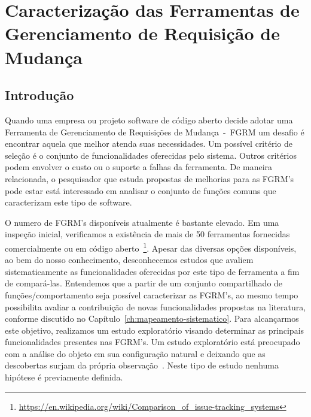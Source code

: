\chapter{Caracterização das Ferramentas de Gerenciamento de Requisição de
	Mudança}
\label{ch:caracterizacao_ferramentas}

\section{Introdução}
\label{sec:caracterizacao_intro}
Quando uma empresa ou projeto software de código aberto decide adotar uma
Ferramenta de Gerenciamento de Requisições de Mudança~-~FGRM um desafio é
encontrar aquela que melhor atenda suas necessidades. Um possível critério de
seleção é o conjunto de funcionalidades oferecidas pelo sistema. Outros
critérios podem envolver o custo ou o suporte a falhas da ferramenta. De
maneira relacionada, o pesquisador que estuda propostas de melhorias para as
FGRM's pode estar está interessado em analisar o conjunto de funções comuns que
caracterizam este tipo de software.

O numero de FGRM's disponíveis atualmente é bastante elevado. Em uma inspeção
inicial, verificamos a existência de mais de 50 ferramentas fornecidas
comercialmente ou em código
aberto~\footnote{\url{https://en.wikipedia.org/wiki/Comparison_of_issue-tracking_systems}}.
Apesar das diversas opções disponíveis, ao bem do nosso conhecimento,
desconhecemos estudos que avaliem sistematicamente as funcionalidades oferecidas
por este tipo de ferramenta a fim de compará-las. Entendemos que a partir de um
conjunto compartilhado de funções/comportamento seja possível caracterizar as
FGRM's, ao mesmo tempo possibilita avaliar a contribuição de novas
funcionalidades propostas na literatura, conforme discutido no
Capítulo~\ref{ch:mapeamento-sistematico}. Para alcançarmos este objetivo,
realizamos um estudo exploratório visando determinar as principais
funcionalidades presentes nas FGRM's. Um estudo exploratório está preocupado com
a análise do objeto em sua configuração natural e deixando que as descobertas
surjam da própria observação~\cite{wohlin2012experimentation}. Neste tipo de
estudo nenhuma hipótese é previamente definida.

